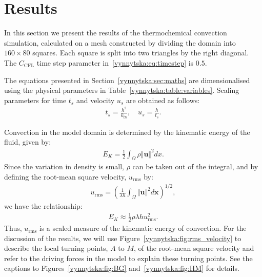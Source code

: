 
\section{Results}
\label{vynnytska:sec:results}

In this section we present the results of the thermochemical
convection simulation, calculated on a mesh constructed by dividing
the domain into $160 \times 80$ squares. Each square is split into two
triangles by the right diagonal. The $C_{\mathrm{CFL}}$ time step
parameter in~\eqref{vynnytska:eq:timestep} is $0.5$.

The equations presented in Section~\ref{vynnytska:sec:maths} are
dimensionalised using the physical parameters in
Table~\ref{vynnytska:table:variables}. Scaling parameters for time
$t_s$ and velocity $u_s$ are obtained as follows:
\begin{align}
 \label{vynnytska:eq:velsc}
 t_s = \frac{h^2}{k_{th}}, \quad u_s = \frac{h}{t_s}.
\end{align}

Convection in the model domain is determined by the
kinematic energy of the fluid, given by:
\begin{align}
  \label{vynnytska:eq:KE}
  E_{K} = \frac{1}{2}\int_{\Omega}\rho \Vert \bm{u} \Vert^{2}dx.
\end{align}
Since the variation in density is small, $\rho$ can be taken out of
the integral, and by defining the root-mean square velocity, $u_{\mathrm{rms}}$
by:
\begin{align}
  \label{vynnytska:eq:u_rms}
  u_{\mathrm{rms}} =\left( \frac{1}{\lambda h} \int_{\Omega} \Vert \bm{u} \Vert^{2} d\bm{x}  \right)^{1/2},
\end{align}
we have the relationship:
\begin{align}
  \label{vynnytska:eq:KEu_rms}
  E_{K} \approx \frac{1}{2} \rho \lambda h u_{\mathrm{rms}}^{2}.
\end{align}
Thus, $u_{\mathrm{rms}}$ is a scaled measure of the kinematic energy of
convection. For the discussion of the results, we will use
Figure~\ref{vynnytska:fig:rms_velocity} to describe the local turning
points, $A$ to $M$, of the root-mean square velocity and refer to the
driving forces in the model to explain these turning points. See the
captions to Figures~\ref{vynnytska:fig:BG} and~\ref{vynnytska:fig:HM}
for details.

